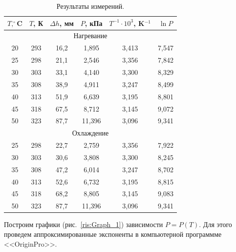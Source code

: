 \documentclass[a4paper,12pt]{article} %
\begin{document}
\begin{table}[h!]
\caption{Результаты измерений.}
\label{table:results_1}
\begin{tabular}{|c|c|c|c|c|c}
\hline
$T, ^\circ$C & $T$, К & $\Delta h$, мм & $P$, кПа & $T^{-1} \cdot 10^3$, K$^{-1}$ & \multicolumn{1}{c|}{$\ln P$} \\ \hline
\multicolumn{6}{|c|}{Нагревание}                                                                                 \\ \hline
20           & 293    & 16,2           & 1,895    & 3,413                         & \multicolumn{1}{c|}{7,547}   \\ \hline
25           & 298    & 21,1           & 2,546    & 3,356                         & \multicolumn{1}{c|}{7,842}   \\ \hline
30           & 303    & 33,1           & 4,140    & 3,300                         & \multicolumn{1}{c|}{8,329}   \\ \hline
35           & 308    & 38,9           & 4,911    & 3,247                         & \multicolumn{1}{c|}{8,499}   \\ \hline
40           & 313    & 51,9           & 6,639    & 3,195                         & \multicolumn{1}{c|}{8,801}   \\ \hline
45           & 318    & 67,5           & 8,712    & 3,145                         & \multicolumn{1}{c|}{9,072}   \\ \hline
50           & 323    & 87,7           & 11,396   & 3,096                         & \multicolumn{1}{c|}{9,341}   \\ \hline
\multicolumn{6}{|c|}{Охлаждение}                                                                                 \\ \hline
25           & 298    & 22,7           & 2,759    & 3,356                         & \multicolumn{1}{c|}{7,922}   \\ \hline
30           & 303    & 30,6           & 3,808    & 3,300                         & \multicolumn{1}{c|}{8,245}   \\ \hline
35           & 308    & 47,2           & 6,014    & 3,247                         & \multicolumn{1}{c|}{8,702}   \\ \hline
40           & 313    & 52,6           & 6,732    & 3,195                         & \multicolumn{1}{c|}{8,815}   \\ \hline
45           & 318    & 68,2           & 8,805    & 3,145                         & \multicolumn{1}{c|}{9,083}   \\ \hline
50           & 323    & 87,7           & 11,396   & 3,096                         & \multicolumn{1}{c|}{9,341}   \\ \hline
\end{tabular}
\end{table}
	Построим графики (рис.~\ref{ris:Graph_1}) зависимости $P = P(T)$. Для этого проведем аппроксимированные экспоненты в компьютерной программме <<OriginPro>>.
\end{document}
